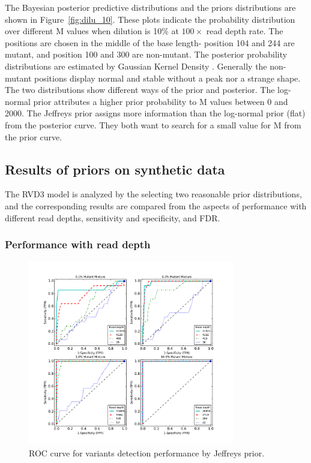 \documentclass{bioinfo}
\begin{document}
The Bayesian posterior predictive distributions and the priors distributions are shown in Figure~\ref{fig:dilu_10}.
These plots indicate the probability distribution over different M values when dilution is 10\% at $100\times$ read depth rate.
The positions are chosen in the middle of the base length- position 104 and 244 are mutant, and position 100 and 300 are non-mutant.
The posterior probability distributions are estimated by Gaussian Kernel Density \citep{silverman1986density}.
Generally the non-mutant positions display normal and stable without a peak nor a strange shape.
The two distributions show different ways of the prior and posterior.
The log-normal prior attributes a higher prior probability to M values between 0 and 2000.
The Jeffreys prior assigns more information than the log-normal prior (flat) from the posterior curve.
They both want to search for a small value for M from the prior curve.

\subsection{Results of priors on synthetic data}
The RVD3 model is analyzed by the selecting two reasonable prior distributions, and the corresponding results are compared from the aspects of performance with different read depths, sensitivity and specificity, and FDR.

\subsubsection{Performance with read depth}

\begin{figure}[htbp]
\begin{center}
\includegraphics[width=90mm]{figs/ROC_without_chi2_jeffrey.pdf}
\caption{ROC curve for variants detection performance by Jeffreys prior.}
\label{fig:ROC_jeffrey}
\end{center}
\end{figure}
\end{document}
